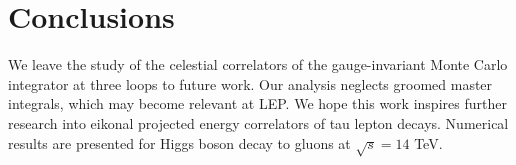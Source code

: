 \section{Conclusions}\label{sec:conclusions}

We leave the study of the celestial correlators of the gauge-invariant
Monte Carlo integrator at three loops to future work. Our analysis
neglects groomed master integrals, which may become relevant at LEP. We
hope this work inspires further research into eikonal projected energy
correlators of tau lepton decays. Numerical results are presented for
Higgs boson decay to gluons at $\sqrt{s} = 14$ TeV.

